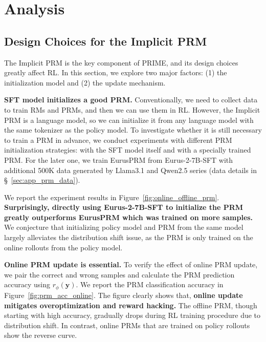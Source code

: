 \vspace{-10pt}


\section{Analysis}

\subsection{Design Choices for the Implicit PRM}
\label{sec:design}
The Implicit PRM is the key component of PRIME, and its design choices greatly affect RL. In this section, we explore two major factors: (1) the initialization model and (2) the update mechanism.


\textbf{SFT model initializes a good PRM.}
Conventionally, we need to collect data to train RMs and PRMs, and then we can use them in RL. However, the Implicit PRM is a language model, so we can initialize it from any language model with the same tokenizer as the policy model. To investigate whether it is still necessary to train a PRM in advance, we conduct experiments with different PRM initialization strategies: with the SFT model itself and with a specially trained PRM. For the later one, we train EurusPRM from Eurus-2-7B-SFT with additional 500K data generated by Llama3.1 and Qwen2.5 series (data details in \S~\ref{sec:app_prm_data}). 

We report the experiment results in Figure~\ref{fig:online_offline_prm}. \textbf{Surprisingly, directly using Eurus-2-7B-SFT to initialize the PRM greatly outperforms EurusPRM which was trained on more samples.} We conjecture that initializing policy model and PRM from the same model largely alleviates the distribution shift issue, as the PRM is only trained on the online rollouts from the policy model.




\textbf{Online PRM update is essential.}
To verify the effect of online PRM update, we pair the correct and wrong samples and calculate the PRM prediction accuracy using $r_\phi(\mathbf{y})$.
We report the PRM classification accuracy in Figure~\ref{fig:prm_acc_online}. 
The figure clearly shows that, \textbf{online update mitigates overoptimization and reward hacking.}
The offline PRM, though starting with high accuracy, gradually drops during RL training procedure due to distribution shift. In contrast, online PRMs that are trained on policy rollouts show the reverse curve.


